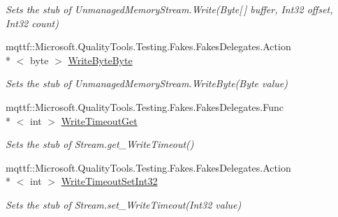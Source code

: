 \begin{DoxyCompactItemize}
\begin{DoxyCompactList}\small\item\em Sets the stub of Unmanaged\-Memory\-Stream.\-Write(\-Byte\mbox{[}$\,$\mbox{]} buffer, Int32 offset, Int32 count)\end{DoxyCompactList}\item 
mqttf\-::\-Microsoft.\-Quality\-Tools.\-Testing.\-Fakes.\-Fakes\-Delegates.\-Action\\*
$<$ byte $>$ \hyperlink{class_system_1_1_i_o_1_1_fakes_1_1_stub_unmanaged_memory_stream_aeee8d93c95b5cee54ef7244163fdf404}{Write\-Byte\-Byte}
\begin{DoxyCompactList}\small\item\em Sets the stub of Unmanaged\-Memory\-Stream.\-Write\-Byte(\-Byte value)\end{DoxyCompactList}\item 
mqttf\-::\-Microsoft.\-Quality\-Tools.\-Testing.\-Fakes.\-Fakes\-Delegates.\-Func\\*
$<$ int $>$ \hyperlink{class_system_1_1_i_o_1_1_fakes_1_1_stub_unmanaged_memory_stream_a1eedd46a886a001b59e51d21a1635862}{Write\-Timeout\-Get}
\begin{DoxyCompactList}\small\item\em Sets the stub of Stream.\-get\-\_\-\-Write\-Timeout()\end{DoxyCompactList}\item 
mqttf\-::\-Microsoft.\-Quality\-Tools.\-Testing.\-Fakes.\-Fakes\-Delegates.\-Action\\*
$<$ int $>$ \hyperlink{class_system_1_1_i_o_1_1_fakes_1_1_stub_unmanaged_memory_stream_a3bf910c40c5c43495cb4833f6d72ed08}{Write\-Timeout\-Set\-Int32}
\begin{DoxyCompactList}\small\item\em Sets the stub of Stream.\-set\-\_\-\-Write\-Timeout(\-Int32 value)\end{DoxyCompactList}\end{DoxyCompactItemize}
